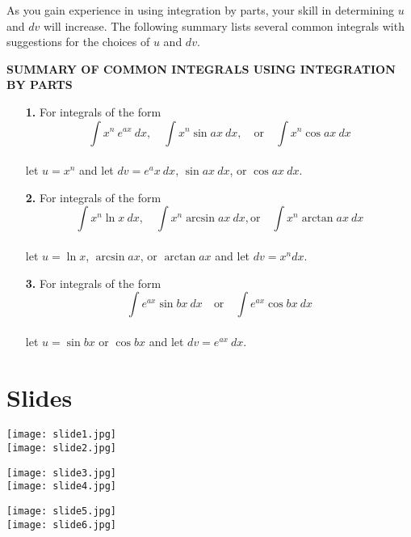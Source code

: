 \documentclass[oneside]{book}
\begin{document}
As you gain experience in using integration by parts, your skill in determining $u$ and $dv$ will increase. The following summary lists several common integrals with suggestions for the choices of $u$ and $dv$.

\bigskip
\sffamily
\begin{tcolorbox}[colback = beige!75!white,
				  sharp corners = all,
				  colframe = beige!75!white]
\textbf{SUMMARY OF COMMON INTEGRALS USING INTEGRATION BY PARTS}
\rmfamily
\begin{enumerate}
\item[\textbf{1.}] For integrals of the form \\
$$ \int x^n \ e^{ax} \ dx, \quad \int x^n \sin ax \ dx, \quad \text{or} \quad \int x^n \cos ax \ dx $$ \\
let $u = x^n$ and let $dv = e^ax \ dx$, $\sin ax \ dx$, or $ \cos ax \ dx$.

\item[\textbf{2.}] For integrals of the form \\
$$ \int x^n \ln x \ dx, \quad \int x^n \arcsin ax \ dx, \text{or} \quad \int x^n \arctan ax \ dx $$ \\
let $u = \ln x$, $\arcsin ax$, or $\arctan ax$ and let $dv = x^n dx$.

\item[\textbf{3.}] For integrals of the form \\
$$ \int e^{ax} \sin bx \ dx \quad \text{or} \quad \int e^{ax} \cos bx \ dx$$ \\
let $u = \sin bx$ or $\cos bx$ and let $dv = e^{ax} \ dx$.

\end{enumerate}
\end{tcolorbox}

\cite{Calc}

\chapter{Slides}
\texttt{[image: slide1.jpg]}\\
\texttt{[image: slide2.jpg]}

\newpage
\begin{center}
\texttt{[image: slide3.jpg]}\\
\texttt{[image: slide4.jpg]}
\end{center}

\newpage
\begin{center}
\texttt{[image: slide5.jpg]}\\
\texttt{[image: slide6.jpg]}
\end{center}
\end{document}
